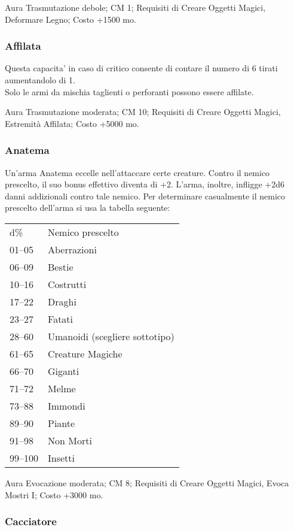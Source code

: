 \begin{multicols}{2}
Aura Trasmutazione debole; CM 1; Requisiti di Creare Oggetti Magici, Deformare Legno; Costo +1500 mo.

\subsubsection{Affilata}

Questa capacita' in caso di critico consente di contare il numero di 6 tirati aumentandolo di 1.\\
Solo le armi da mischia taglienti o perforanti possono essere affilate.

Aura Trasmutazione moderata; CM 10; Requisiti di Creare Oggetti Magici, Estremità Affilata; Costo +5000 mo.

\subsubsection{Anatema}

Un'arma Anatema eccelle nell'attaccare certe creature. Contro il nemico prescelto, il suo bonus effettivo diventa di +2. L'arma, inoltre, infligge +2d6 danni addizionali contro tale nemico. Per determinare casualmente il nemico prescelto dell'arma si usa la tabella seguente:

\medskip

\begin{tabular}{ll}
d\% 	&Nemico prescelto\\
01–05 	&Aberrazioni\\
06–09 	&Bestie\\
10–16 	&Costrutti\\
17–22 	&Draghi\\
23–27 	&Fatati\\
28–60 	&Umanoidi (scegliere sottotipo)\\
61–65 	&Creature Magiche\\
66–70 	&Giganti\\
71–72 	&Melme\\
73–88 	&Immondi\\
89–90 	&Piante\\
91–98 	&Non Morti\\
99–100 	&Insetti\\
\end{tabular}

\medskip

Aura Evocazione moderata; CM 8; Requisiti di Creare Oggetti Magici, Evoca Mostri I; Costo +3000 mo.

\subsubsection{Cacciatore}


\end{multicols}
